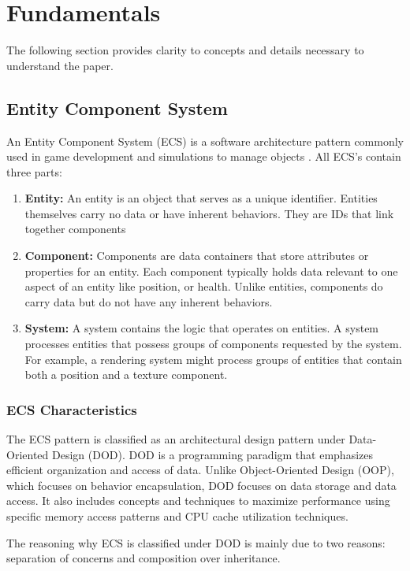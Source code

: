 \section{Fundamentals}

The following section provides clarity to concepts and details necessary to understand the paper.

\subsection{Entity Component System}
An Entity Component System (ECS) is a software architecture pattern commonly used in game development and simulations to manage objects \cite{RomeoPHD}. All ECS's contain three parts:
\begin{enumerate}
    \item \textbf{Entity:} An entity is an object that serves as a unique identifier. Entities themselves carry no data or have inherent behaviors. They are IDs that link together components
    \item \textbf{Component:} Components are data containers that store attributes or properties for an entity. Each component typically holds data relevant to one aspect of an entity like position, or health. Unlike entities, components do carry data but do not have any inherent behaviors.
    \item \textbf{System:} A system contains the logic that operates on entities. A system processes entities that possess groups of components requested by the system. For example, a rendering system might process groups of entities that contain both a position and a texture component. 
\end{enumerate}

\subsubsection{ECS Characteristics}
The ECS pattern is classified as an architectural design pattern under Data-Oriented Design (DOD)\cite{RomeoPHD}. DOD is a programming paradigm that emphasizes efficient organization and access of data. Unlike Object-Oriented Design (OOP), which focuses on behavior encapsulation, DOD focuses on data storage and data access. It also includes concepts and techniques to maximize performance using specific memory access patterns and CPU cache utilization techniques.

The reasoning why ECS is classified under DOD is mainly due to two reasons: separation of concerns and composition over inheritance.

